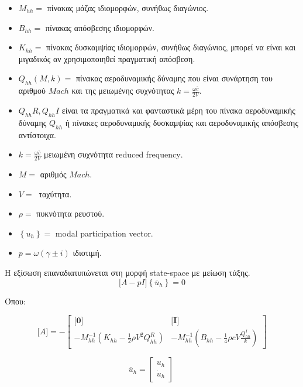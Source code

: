 \begin{itemize} 
  \item $M_{hh} =$ πίνακας μάζας ιδιομορφών, συνήθως διαγώνιος. 
  \item $B_{hh} =$ πίνακας απόσβεσης ιδιομορφών. 
  \item $K_{hh} =$ πίνακας δυσκαμψίας ιδιομορφών, συνήθως διαγώνιος, μπορεί να είναι και μιγαδικός αν χρησιμοποιηθεί πραγματική απόσβεση. 
  \item $Q_{hh}(M,k) =$ πίνακας αεροδυναμικής δύναμης που είναι συνάρτηση του αριθμού $Mach$ και της μειωμένης συχνότητας $k = \frac{\omega\overline{c}}{2V}$.
  \item $Q_{hh}{R}, Q_{hh}{I}$ είναι τα πραγματικά και φανταστικά μέρη του πίνακα αεροδυναμικής δύναμης $Q_{hh}$ ή πίνακες αεροδυναμικής δυσκαμψίας και αεροδυναμικής απόσβεσης αντίστοιχα. 
  \item $k = \frac{\omega\overline{c}}{2V}$ μειωμένη συχνότητα \textlatin{reduced frequency}. 
  \item $M =$ αριθμός $Mach$. 
  \item $V = \ $ ταχύτητα. 
  \item $\rho =$ πυκνότητα ρευστού. 
  \item $\left\{ u_{h} \right\} =$ \textlatin{modal participation vector.}
  \item $p = \omega(\gamma \pm i)$ ιδιοτιμή. 
\end{itemize}


Η εξίσωση επαναδιατυπώνεται στη μορφή \textlatin{state-space} με μείωση τάξης.
\begin{equation}
    \label{eq:PKss}
\lbrack A - pI\rbrack\left\{ {\overline{u}}_{h} \right\} = 0
\end{equation}

Όπου:

\begin{equation}
\lbrack A\rbrack = - \begin{bmatrix}
\mathbf{\lbrack 0\rbrack} & \mathbf{\lbrack I\rbrack} \\
 - M_{hh}^{- 1}\left( K_{hh} - \frac{1}{2}\rho V^{2}Q_{hh}^{R} \right) & - M_{hh}^{- 1}\left( B_{hh} - \frac{1}{4}\rho cV\frac{Q_{hh}^{I}}{k} \right)
\end{bmatrix}
\end{equation}

\begin{equation}
  {\overline{u}}_{h} = \begin{bmatrix}
    u_{h} \\
    {\dot{u}}_{h}
    \end{bmatrix}\  
\end{equation}


